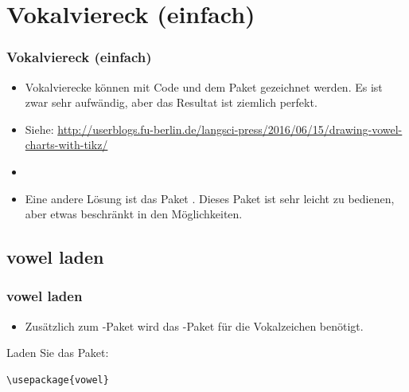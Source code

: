 \section{Vokalviereck (einfach)}

\begin{frame}[fragile]
\frametitle{Vokalviereck (einfach)}

\begin{itemize}
	
	\item Vokalvierecke können mit Code und dem Paket  gezeichnet werden. Es ist zwar sehr aufwändig, aber das Resultat ist ziemlich perfekt.
	
	\item[\ras] Siehe: \url{http://userblogs.fu-berlin.de/langsci-press/2016/06/15/drawing-vowel-charts-with-tikz/}
	
	\item[]
	
	\item Eine andere Lösung ist das Paket . Dieses Paket ist sehr leicht zu bedienen, aber etwas beschränkt in den Möglichkeiten.
	
\end{itemize}


\end{frame}


\subsection{vowel laden}

\begin{frame}[fragile]
\frametitle{vowel laden}

\begin{itemize}

	\item Zusätzlich zum -Paket wird das -Paket für die Vokalzeichen benötigt.
	
\end{itemize}

Laden Sie das Paket:

\begin{lstlisting}
\usepackage{vowel}
\end{lstlisting}


\end{frame}


